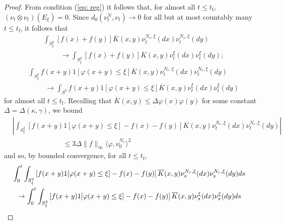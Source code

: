 \documentclass[11pt, notitlepage]{article}
\begin{document}
\begin{proof}
From condition (\ref{eq: reg}) it follows that, for almost all $t\le t_\mathrm{f}$, $(\nu_t\otimes \nu_t)(E_\xi)=0$. Since $d_0\left(\nu^N_t, \nu_t\right) \rightarrow 0$ for all but at most  countably many $t\le t_\mathrm{f}$, it follows that
\begin{equation}\begin{split}
    &\int_{S_\xi^2}\left[f(x) + f(y)\right]\overline{K}(x,y)\nu^{N_r,\xi}_t(d x)\nu^{N_r,\xi}_t(d y)\\& \hspace{1cm}\rightarrow
\int_{S_\xi^2}\left[f(x) + f(y)\right]\overline{K}(x,y)\nu^\xi_t(d x)\nu^\xi_t(d y); \end{split}
\end{equation}
\begin{equation}\begin{split}&
     \int_{S_\xi^2}f(x+y)1[\varphi(x+y) \le \xi]\overline{K}(x,y)\nu^{N_r,\xi}_t(d x)\nu^{N_r,\xi}_t(d y)
 \\& \hspace{1cm}   \rightarrow \int_{S^2} f(x+y)1[\varphi(x+y) \le \xi]\overline{K}(x,y)\nu^\xi_t(d x)\nu^\xi_t(d y) \end{split}
\end{equation}
for almost all $t\le t_\mathrm{f}$.
Recalling that $\overline{K}(x,y)\le \Delta \varphi(x)\varphi(y)$ for some constant $\Delta=\Delta(\kappa,\gamma)$, we bound \begin{equation}\label{eq: bound on Lxigel 1}\begin{split}
    &\left|\int_{S_\xi^2} \left[f(x+y)1[\varphi(x+y)\le \xi]-f(x)-f(y)\right] \overline{K}(x,y)\nu^{N_r,\xi}_t(dx)\nu^{N_r,\xi}_t(dy)\right| \\& \hspace{3cm}  \le 3\Delta\|f\|_\infty\langle \varphi, \nu^{N_r}_0\rangle^2 \end{split}
\end{equation} and so, by bounded convergence, for all $t\le t_\mathrm{f}$, \begin{equation} \begin{split}
   & \hspace{-0.2cm} \int_0^t \int_{S_\xi^2}\left[f(x+y)1[\varphi(x+y) \leq \xi] - f(x) - f(y)\right]
      \overline{K}(x,y)\nu^{N_r,\xi}_s(d x)\nu^{N_r,\xi}_s(d y)d s
    \\&\rightarrow
    \int_0^t \int_{S_\xi^2}\left[f(x+y)1[\varphi(x+y) \leq \xi] - f(x) - f(y)\right]
      \overline{K}(x,y)\nu^\xi_s(d x)\nu^\xi_s(d y)d s
\end{split} \end{equation}

\end{proof}
\end{document}
